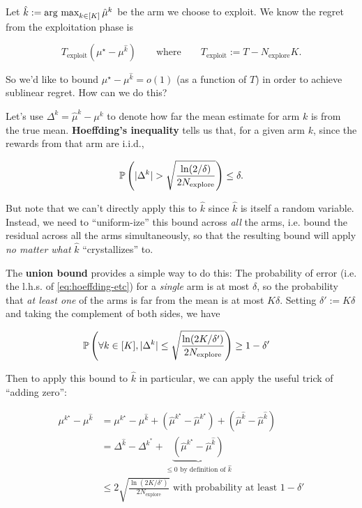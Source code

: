 \documentclass[\main/main]{subfiles}
\begin{document}
Let $\hat k := \argmax_{k \in [K]} \hat \mu^k$ be the arm we choose to exploit. We know the regret from the exploitation phase is

\[
    T_{\text{exploit}} (\mu^\star - \mu^{\hat k}) \qquad \text{where} \qquad T_{\text{exploit}} := T - N_{\text{explore}} K.
\]

So we'd like to bound $\mu^\star - \mu^{\hat k} = o(1)$ (as a function of $T$) in order to achieve sublinear regret. How can we do this?

Let's use $\Delta^k = \hat \mu^k - \mu^k$ to denote how far the mean estimate for arm $k$ is from the true mean. \textbf{Hoeffding's inequality}  tells us that, for a given arm $k$, since the rewards from that arm are i.i.d.,

\begin{equation}
    \P\left(|\Delta^k | > \sqrt{\frac{\ln(2/\delta)}{2N_{\text{explore}}}} \right) \le \delta. \label{eq:hoeffding-etc}
\end{equation}


But note that we can't directly apply this to $\hat k$ since $\hat k$ is itself a random variable. Instead, we need to ``uniform-ize'' this bound across \emph{all} the arms, i.e. bound the residual across all the arms simultaneously, so that the resulting bound will apply \emph{no matter what} $\hat k$ ``crystallizes'' to.

The \textbf{union bound} provides a simple way to do this: The probability of error (i.e. the l.h.s. of \ref*{eq:hoeffding-etc}) for a \emph{single} arm is at most $\delta$, so the probability that \emph{at least one} of the arms is far from the mean is at most $K \delta$. Setting $\delta' := K \delta$ and taking the complement of both sides, we have

\begin{align*}
    \P\left( \forall k \in [K], |\Delta^k | \le \sqrt{\frac{\ln(2K/\delta')}{2N_{\text{explore}}}} \right) &\ge 1-\delta'
\end{align*}

Then to apply this bound to $\hat k$ in particular, we can apply the useful trick of ``adding zero'':

\begin{align*}
    \mu^{k^\star} - \mu^{\hat k} &= \mu^{k^\star} - \mu^{\hat k} + (\hat \mu^{k^\star} - \hat \mu^{k^\star}) + (\hat \mu^{\hat k} - \hat \mu^{\hat k}) \\
    &= \Delta^{\hat k} - \Delta^{k^*} + \underbrace{(\hat \mu^{k^\star} - \hat \mu^{\hat k})}_{\le 0 \text{ by definition of } \hat k} \\
    &\le 2 \sqrt{\frac{\ln(2K/\delta')}{2N_{\text{explore}}}} \text{ with probability at least } 1-\delta'
\end{align*}
\end{document}
